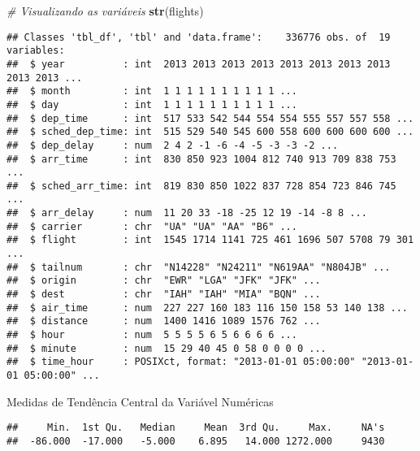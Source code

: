 \documentclass[]{article}
\newenvironment{Shaded}{\begin{snugshade}}{\end{snugshade}}
\newcommand{\CommentTok}[1]{\textcolor[rgb]{0.56,0.35,0.01}{\textit{#1}}}
\newcommand{\KeywordTok}[1]{\textcolor[rgb]{0.13,0.29,0.53}{\textbf{#1}}}
\newcommand{\NormalTok}[1]{#1}
\newcommand{\OperatorTok}[1]{\textcolor[rgb]{0.81,0.36,0.00}{\textbf{#1}}}
\begin{document}
\begin{Shaded}
\begin{Highlighting}[]
\CommentTok{# Visualizando as variáveis}
\KeywordTok{str}\NormalTok{(flights)}
\end{Highlighting}
\end{Shaded}

\begin{verbatim}
## Classes 'tbl_df', 'tbl' and 'data.frame':    336776 obs. of  19 variables:
##  $ year          : int  2013 2013 2013 2013 2013 2013 2013 2013 2013 2013 ...
##  $ month         : int  1 1 1 1 1 1 1 1 1 1 ...
##  $ day           : int  1 1 1 1 1 1 1 1 1 1 ...
##  $ dep_time      : int  517 533 542 544 554 554 555 557 557 558 ...
##  $ sched_dep_time: int  515 529 540 545 600 558 600 600 600 600 ...
##  $ dep_delay     : num  2 4 2 -1 -6 -4 -5 -3 -3 -2 ...
##  $ arr_time      : int  830 850 923 1004 812 740 913 709 838 753 ...
##  $ sched_arr_time: int  819 830 850 1022 837 728 854 723 846 745 ...
##  $ arr_delay     : num  11 20 33 -18 -25 12 19 -14 -8 8 ...
##  $ carrier       : chr  "UA" "UA" "AA" "B6" ...
##  $ flight        : int  1545 1714 1141 725 461 1696 507 5708 79 301 ...
##  $ tailnum       : chr  "N14228" "N24211" "N619AA" "N804JB" ...
##  $ origin        : chr  "EWR" "LGA" "JFK" "JFK" ...
##  $ dest          : chr  "IAH" "IAH" "MIA" "BQN" ...
##  $ air_time      : num  227 227 160 183 116 150 158 53 140 138 ...
##  $ distance      : num  1400 1416 1089 1576 762 ...
##  $ hour          : num  5 5 5 5 6 5 6 6 6 6 ...
##  $ minute        : num  15 29 40 45 0 58 0 0 0 0 ...
##  $ time_hour     : POSIXct, format: "2013-01-01 05:00:00" "2013-01-01 05:00:00" ...
\end{verbatim}

Medidas de Tendência Central da Variável Numéricas

\begin{Shaded}
\end{Shaded}

\begin{verbatim}
##     Min.  1st Qu.   Median     Mean  3rd Qu.     Max.     NA's 
##  -86.000  -17.000   -5.000    6.895   14.000 1272.000     9430
\end{verbatim}

\begin{Shaded}
\end{Shaded}
\end{document}
